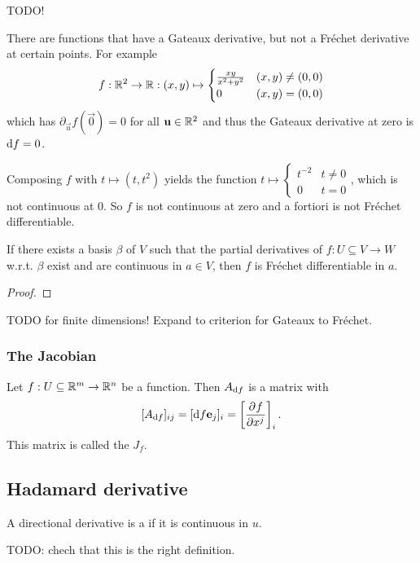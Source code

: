 \begin{example}
TODO!

There are functions that have a Gateaux derivative, but not a Fréchet derivative at certain points. For example
\[ f: \mathbb{R}^2\to \mathbb{R}: (x,y) \mapsto \begin{cases}
\frac{xy}{x^2+y^2} & (x,y)\neq (0,0) \\0 & (x,y) = (0,0)
\end{cases} \]
which has $\partial_{\vec{u}}f(\vec{0}) = 0$ for all $\boldsymbol{\mathrm{u}}\in \mathbb{R}^2$ and thus the Gateaux derivative at zero is $\operatorname{d \!}{f} = 0$.

Composing $f$ with $t\mapsto (t,t^2)$ yields the function $t\mapsto \begin{cases}
t^{-2} & t\neq 0 \\ 0 & t=0
\end{cases}$, which is not continuous at $0$. So $f$ is not continuous at zero and a fortiori is not Fréchet differentiable.
\end{example}

\begin{proposition}
If there exists a basis $\beta$ of $V$ such that the partial derivatives of $f:U\subseteq V\to W$ w.r.t. $\beta$ exist and are continuous in $a\in V$, then $f$ is Fréchet differentiable in $a$.
\end{proposition}
\begin{proof}

\end{proof}
TODO for finite dimensions! Expand to criterion for Gateaux to Fréchet.
\begin{example}

\end{example}

\subsubsection{The Jacobian}
\begin{definition}
Let $f:U\subseteq\mathbb{R}^m\to\mathbb{R}^n$ be a function. Then $A_{\operatorname{d \!}{f}}$ is a matrix with
\[ [A_{\operatorname{d \!}{f}}]_{ij} = [\operatorname{d \!}{f}\boldsymbol{\mathrm{e}}_j]_i = \left[ \frac{\partial{^{}}f}{\partial{{x^j}^{}}} \right]_i. \]
This matrix is called the  $J_f$.
\end{definition}

\subsection{Hadamard derivative}
\begin{definition}
A directional derivative is a  if it is continuous in $u$.
\end{definition}
TODO: chech that this is the right definition.



